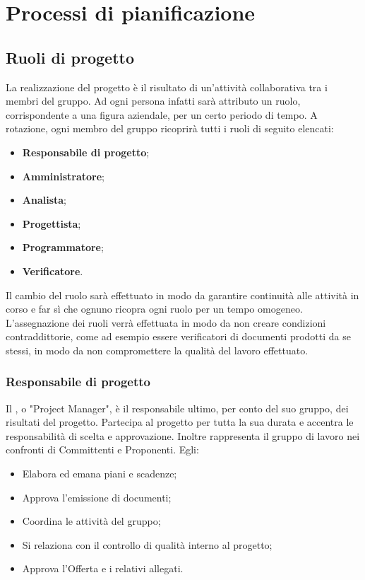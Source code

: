 \documentclass[NormeDiProgetto.tex]{subfiles}
\begin{document}
	\section{Processi di pianificazione}
	\subsection{Ruoli di progetto}
	La realizzazione del progetto è il risultato di un'attività collaborativa tra i membri del gruppo. Ad ogni persona infatti sarà attributo un ruolo, corrispondente a una figura aziendale, per un certo periodo di tempo. A rotazione, ogni membro del gruppo ricoprirà tutti i ruoli di seguito elencati:
	\begin{itemize}
		\item \textbf{Responsabile di progetto};
		\item \textbf{Amministratore};
		\item \textbf{Analista};
		\item \textbf{Progettista};
		\item \textbf{Programmatore};
		\item \textbf{Verificatore}.
	\end{itemize}
	Il cambio del ruolo sarà effettuato in modo da garantire continuità alle attività in corso e far sì che ognuno ricopra ogni ruolo per un tempo omogeneo.\\ L'assegnazione dei ruoli verrà effettuata \respdiprog  in modo da non creare condizioni contraddittorie, come ad esempio essere verificatori di documenti prodotti da se stessi, in modo da non compromettere la qualità del lavoro effettuato.
	\subsubsection{Responsabile di progetto}
	Il \respdiprog, o "Project Manager", è il responsabile ultimo, per conto del suo gruppo, dei risultati del progetto. Partecipa al progetto per tutta la sua durata e accentra le responsabilità di scelta e approvazione. Inoltre rappresenta il gruppo di lavoro nei confronti di Committenti e Proponenti. Egli:
	\begin{itemize}
		\item Elabora ed emana piani e scadenze;
		\item Approva l'emissione di documenti;
		\item Coordina le attività del gruppo;
		\item Si relaziona con il controllo di qualità interno al progetto;
		\item Approva l'Offerta e i relativi allegati.
	\end{itemize}
\end{document}
